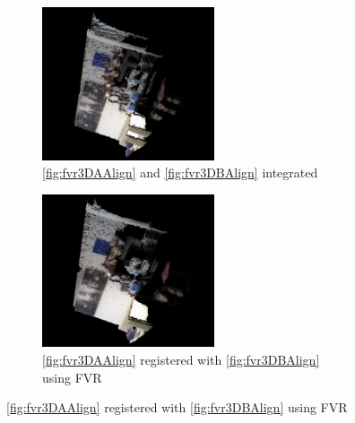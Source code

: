 \begin{figure}[!htb] 
        \centering
        
		\begin{subfigure}[b]{3.0in}
				       \centering
                \includegraphics[width=2.0in]{images/methodology/FVR/fvr3d/PCAFrameAB}
                \caption{\ref{fig:fvr3DAAlign} and \ref{fig:fvr3DBAlign} integrated}
                \label{fig:fvr3DPCAAB}
        \end{subfigure}%
        \begin{subfigure}[b]{3.0in}
               \centering
                \includegraphics[width=2.0in]{images/methodology/FVR/fvr3d/FVRPCAFrameAB}
                \caption{\ref{fig:fvr3DAAlign} registered with \ref{fig:fvr3DBAlign} using FVR}
                \label{fig:fvr3DFVRPCAAB}
        \end{subfigure}        
        

\end{figure}
